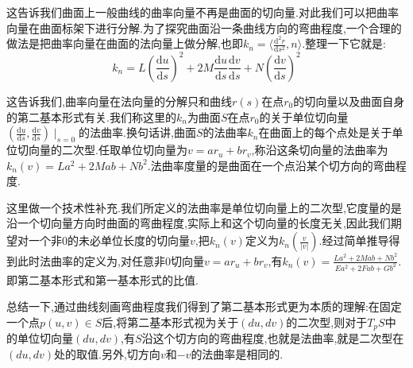 这告诉我们曲面上一般曲线的曲率向量不再是曲面的切向量.对此我们可以把曲率向量在曲面标架下进行分解.为了探究曲面沿一条曲线方向的弯曲程度,一个合理的做法是把曲率向量在曲面的法向量上做分解,也即$k_n=\langle \frac{\mathrm{d}^2r}{\mathrm{d}s^2},n\rangle$.整理一下它就是:
$$k_n=L\left(\frac{\mathrm{d}u}{\mathrm{d}s}\right)^2+2M\frac{\mathrm{d}u}{\mathrm{d}s}\frac{\mathrm{d}v}{\mathrm{d}s}+N\left(\frac{\mathrm{d}v}{\mathrm{d}s}\right)^2$$

这告诉我们,曲率向量在法向量的分解只和曲线$r(s)$在点$r_0$的切向量以及曲面自身的第二基本形式有关.我们称这里的$k_n$为曲面$S$在点$r_0$的关于单位切向量$\left(\frac{\mathrm{d}u}{\mathrm{d}s},\frac{\mathrm{d}v}{\mathrm{d}s}\right)\mid_{s=0}$的法曲率.换句话讲,曲面$S$的法曲率$k_n$在曲面上的每个点处是关于单位切向量的二次型.任取单位切向量为$v=ar_u+br_v$,称沿这条切向量的法曲率为$k_n(v)=La^2+2Mab+Nb^2$.法曲率度量的是曲面在一个点沿某个切方向的弯曲程度.

这里做一个技术性补充.我们所定义的法曲率是单位切向量上的二次型,它度量的是沿一个切向量方向时曲面的弯曲程度,实际上和这个切向量的长度无关,因此我们期望对一个非0的未必单位长度的切向量$v$,把$k_n(v)$定义为$k_n(\frac{v}{|v|})$.经过简单推导得到此时法曲率的定义为,对任意非0切向量$v=ar_u+br_v$,有$k_n(v)=\frac{La^2+2Mab+Nb^2}{Ea^2+2Fab+Gb^2}$.即第二基本形式和第一基本形式的比值.

总结一下,通过曲线刻画弯曲程度我们得到了第二基本形式更为本质的理解:在固定一个点$p(u,v)\in S$后,将第二基本形式视为关于$(du,dv)$的二次型,则对于$T_pS$中的单位切向量$(du,dv)$,有$S$沿这个切方向的弯曲程度,也就是法曲率,就是二次型在$(du,dv)$处的取值.另外,切方向$v$和$-v$的法曲率是相同的.

